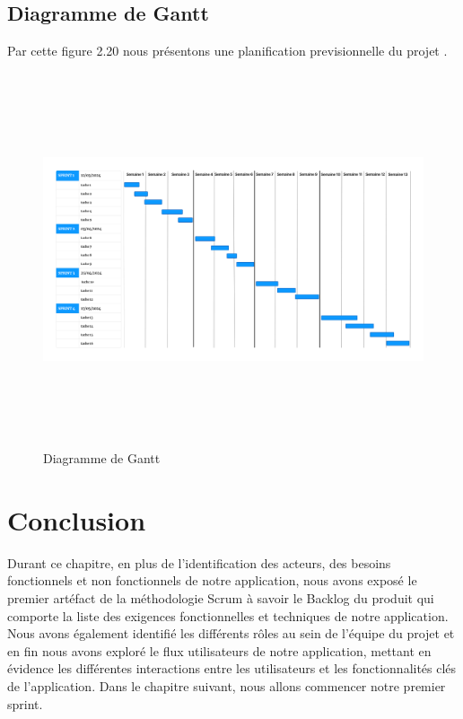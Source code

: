 

\newpage
\subsection{Diagramme de Gantt }

Par cette figure 2.20 nous présentons une planification previsionnelle du projet .

\begin{figure}[ht!]
  \centering
  \includegraphics[width=1\textwidth,height=11cm]{chap2.images/diagramme de gantt.png}
  \caption{Diagramme de Gantt}
\end{figure}







\section*{Conclusion}
\bigskip
\begin{sloppypar}
  Durant ce chapitre, en plus de l'identification  des acteurs, des besoins fonctionnels et non fonctionnels de notre application,  nous avons exposé le premier artéfact de la méthodologie Scrum à savoir le Backlog du produit qui comporte la liste des exigences fonctionnelles et techniques de notre application. Nous avons également identifié les différents rôles au sein de l'équipe du projet et en fin nous avons  exploré le flux utilisateurs de notre application, mettant en évidence les différentes interactions entre les utilisateurs et les fonctionnalités clés de l'application.
  Dans le chapitre suivant, nous allons commencer notre premier sprint.
\end{sloppypar}





